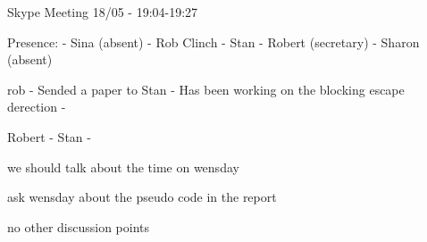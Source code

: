 Skype Meeting 18/05 - 19:04-19:27	

Presence:
	- Sina (absent)
	- Rob Clinch 
	- Stan 
	- Robert (secretary)
	- Sharon (absent)
	
	rob
	- Sended a paper to Stan
	- Has been working on the blocking escape derection
	- 
	
	Robert
	- 
	Stan
	- 
	
	we should talk about the time on wensday
	
	ask wensday about the pseudo code in the report
	
	no other discussion points
	